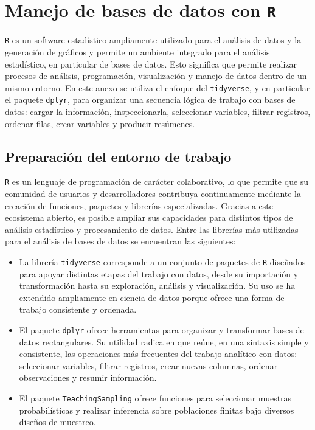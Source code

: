 \documentclass[
  spanish,
  12pt,
]{book}
\begin{document}
\appendix


\chapter{\texorpdfstring{Manejo de bases de datos con \texttt{R}}{Manejo de bases de datos con R}}\label{ap1}

\texttt{R} es un software estadístico ampliamente utilizado para el análisis de datos y la generación de gráficos y permite un ambiente integrado para el análisis estadístico, en particular de bases de datos. Esto significa que permite realizar procesos de análisis, programación, visualización y manejo de datos dentro de un mismo entorno. En este anexo se utiliza el enfoque del \texttt{tidyverse}, y en particular el paquete \texttt{dplyr}, para organizar una secuencia lógica de trabajo con bases de datos: cargar la información, inspeccionarla, seleccionar variables, filtrar registros, ordenar filas, crear variables y producir resúmenes.

\section{Preparación del entorno de trabajo}\label{preparacion-del-entorno-de-trabajo}

\texttt{R} es un lenguaje de programación de carácter colaborativo, lo que permite que su comunidad de usuarios y desarrolladores contribuya continuamente mediante la creación de funciones, paquetes y librerías especializadas. Gracias a este ecosistema abierto, es posible ampliar sus capacidades para distintos tipos de análisis estadístico y procesamiento de datos. Entre las librerías más utilizadas para el análisis de bases de datos se encuentran las siguientes:

\begin{itemize}
\item
  La librería \texttt{tidyverse} \citep{tidyverse2026} corresponde a un conjunto de paquetes de \texttt{R} diseñados para apoyar distintas etapas del trabajo con datos, desde su importación y transformación hasta su exploración, análisis y visualización. Su uso se ha extendido ampliamente en ciencia de datos porque ofrece una forma de trabajo consistente y ordenada.
\item
  El paquete \texttt{dplyr} \citep{dplyr2026} ofrece herramientas para organizar y transformar bases de datos rectangulares. Su utilidad radica en que reúne, en una sintaxis simple y consistente, las operaciones más frecuentes del trabajo analítico con datos: seleccionar variables, filtrar registros, crear nuevas columnas, ordenar observaciones y resumir información.
\item
  El paquete \texttt{TeachingSampling} \citep{GutierrezT2020} ofrece funciones para seleccionar muestras probabilísticas y realizar inferencia sobre poblaciones finitas bajo diversos diseños de muestreo.
\end{itemize}
\end{document}
